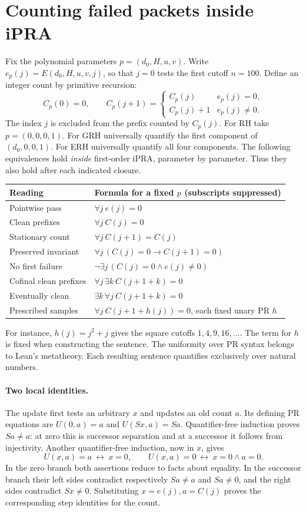 \section{Counting failed packets inside iPRA}\label{sec:audits}
Fix the polynomial parameters \(p=(d_0,H,u,v)\). Write \(e_p(j)=E(d_0,H,u,v,j)\), so that \(j=0\) tests the first cutoff \(n=100\). Define an integer count by primitive recursion:
\[
 C_p(0)=0,\qquad C_p(j+1)=
 \begin{cases} C_p(j)&e_p(j)=0,\\ C_p(j)+1&e_p(j)\ne0.\end{cases}
\]
The index \(j\) is excluded from the prefix counted by \(C_p(j)\). For RH take \(p=(0,0,0,1)\). For GRH universally quantify the first component of \((d_0,0,0,1)\). For ERH universally quantify all four components. The following equivalences hold \emph{inside} first-order iPRA, parameter by parameter. Thus they also hold after each indicated closure.
\begin{center}\small
\begin{tabular}{@{}ll@{}}\toprule
Reading & Formula for a fixed \(p\) (subscripts suppressed)\\\midrule
Pointwise pass & \(\forall j\ e(j)=0\)\\
Clean prefixes & \(\forall j\ C(j)=0\)\\
Stationary count & \(\forall j\ C(j+1)=C(j)\)\\
Preserved invariant & \(\forall j\,(C(j)=0\to C(j+1)=0)\)\\
No first failure & \(\neg\exists j\,(C(j)=0\wedge e(j)\ne0)\)\\
Cofinal clean prefixes & \(\forall j\,\exists k\ C(j+1+k)=0\)\\
Eventually clean & \(\exists k\,\forall j\ C(j+1+k)=0\)\\
Prescribed samples & \(\forall j\ C(j+1+h(j))=0\), each fixed unary PR \(h\)\\\bottomrule
\end{tabular}
\end{center}
For instance, \(h(j)=j^2+j\) gives the square cutoffs \(1,4,9,16,\dots\). The term for \(h\) is fixed when constructing the sentence. The uniformity over PR syntax belongs to Lean's metatheory. Each resulting sentence quantifies exclusively over natural numbers.

\paragraph{Two local identities.}
The update first tests an arbitrary \(x\) and updates an old count \(a\). Its defining PR equations are \(U(0,a)=a\) and \(U(Sx,a)=Sa\). Quantifier-free induction proves \(Sa\ne a\): at zero this is successor separation and at a successor it follows from injectivity. Another quantifier-free induction, now in \(x\), gives
\[
 U(x,a)=a\ \longleftrightarrow\ x=0,\qquad
 U(x,a)=0\ \longleftrightarrow\ x=0\wedge a=0.
\]
In the zero branch both assertions reduce to facts about equality. In the successor branch their left sides contradict respectively \(Sa\ne a\) and \(Sa\ne0\), and the right sides contradict \(Sx\ne0\). Substituting \(x=e(j),a=C(j)\) proves the corresponding step identities for the count.

